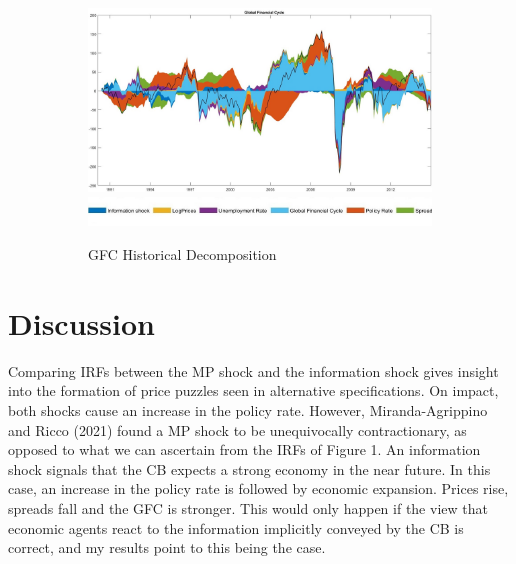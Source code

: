 \documentclass[11pt,a4paper]{article}
\begin{document}
\begin{figure}[hp]
        \vspace{0.2cm} %
        
        \begin{subfigure}{\textwidth}
            \centering
            \includegraphics[scale=.32]{Graphs/GFC_HD_3lags.jpg}
            \includegraphics*[scale=0.21]{Graphs/Inkedlegend.jpg}
            \captionsetup{font=scriptsize}
            \caption{GFC Historical Decomposition}
            \label{fig:GFChd}
        \end{subfigure}

        \caption{ }
        \label{fig:additional_elements}
    \end{figure}




\section{Discussion}


Comparing IRFs between the MP shock and the information shock gives insight into the formation of price puzzles seen in alternative specifications. 
On impact, both shocks cause an increase in the policy rate. However, Miranda-Agrippino and Ricco (2021) found a MP shock to be unequivocally contractionary, as opposed to what we can ascertain from the IRFs of Figure 1. 
An information shock signals that the CB expects a strong economy in the near future. In this case, an increase in the policy rate is followed by economic expansion. Prices rise, spreads fall and the GFC is stronger. 
This would only happen if the view that economic agents react to the information implicitly conveyed by the CB is correct, and my results point to this being the case.
    
\end{document}
